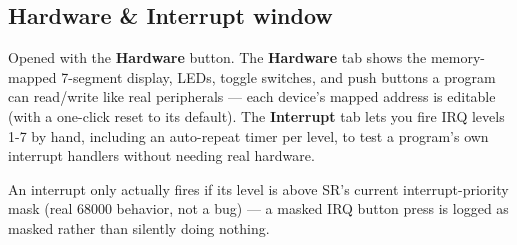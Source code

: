 \subsection*{Hardware \& Interrupt window}
Opened with the \textbf{Hardware} button. The \textbf{Hardware} tab shows the memory-mapped 7-segment display, LEDs, toggle switches, and push buttons a program can read/write like real peripherals — each device's mapped address is editable (with a one-click reset to its default). The \textbf{Interrupt} tab lets you fire IRQ levels 1-7 by hand, including an auto-repeat timer per level, to test a program's own interrupt handlers without needing real hardware.

\begin{tcolorbox}[colback=blue!5!white,colframe=blue!60!black,title=Note]
An interrupt only actually fires if its level is above SR's current interrupt-priority mask (real 68000 behavior, not a bug) — a masked IRQ button press is logged as masked rather than silently doing nothing.
\end{tcolorbox}